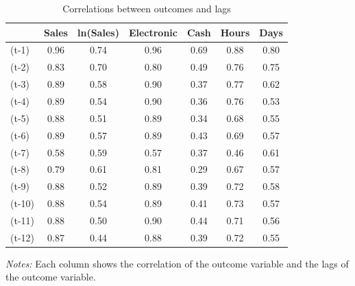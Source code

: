 \documentclass[12pt]{article}
\begin{document}
\begin{table}[H]
\centering
\begin{threeparttable}
\caption{\label{tab:correlations}Correlations between outcomes and lags}

\begin{tabular}{l*{6}{c}}
\toprule
            & Sales & ln(Sales) & Electronic & Cash & Hours & Days \\
\midrule
(t-1)       & 0.96  & 0.74      & 0.96       & 0.69 & 0.88  & 0.80 \\
(t-2)       & 0.83  & 0.70      & 0.80       & 0.49 & 0.76  & 0.75 \\
(t-3)       & 0.89  & 0.58      & 0.90       & 0.37 & 0.77  & 0.62 \\
(t-4)       & 0.89  & 0.54      & 0.90       & 0.36 & 0.76  & 0.53 \\
(t-5)       & 0.88  & 0.51      & 0.89       & 0.34 & 0.68  & 0.55 \\
(t-6)       & 0.89  & 0.57      & 0.89       & 0.43 & 0.69  & 0.57 \\
(t-7)       & 0.58  & 0.59      & 0.57       & 0.37 & 0.46  & 0.61 \\
(t-8)       & 0.79  & 0.61      & 0.81       & 0.29 & 0.67  & 0.57 \\
(t-9)       & 0.88  & 0.52      & 0.89       & 0.39 & 0.72  & 0.58 \\
(t-10)      & 0.88  & 0.54      & 0.89       & 0.41 & 0.73  & 0.57 \\
(t-11)      & 0.88  & 0.50      & 0.90       & 0.44 & 0.71  & 0.56 \\
(t-12)      & 0.87  & 0.44      & 0.88       & 0.39 & 0.72  & 0.55 \\
\bottomrule
\end{tabular}

\begin{tablenotes}[flushleft]
\small
\item \textit{Notes:} Each column shows the correlation of the outcome variable and the lags of the outcome variable.
\end{tablenotes}

\end{threeparttable}
\end{table}
\clearpage
\end{document}

